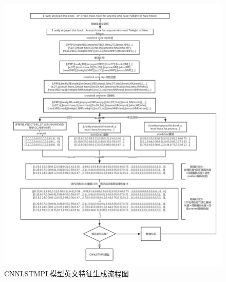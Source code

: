\begin{figure}[!htbp]
\begin{center}
\includegraphics[width=\textwidth]{graphic/preprocessren.png}
\caption{CNNLSTMPL模型英文特征生成流程图 \label{fig:preprocessren}}
\end{center}
\end{figure}